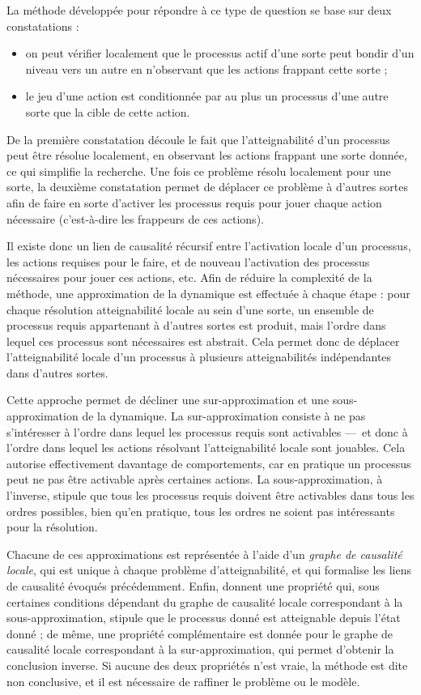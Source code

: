 La méthode développée pour répondre à ce type de question
se base sur deux constatations :
\begin{itemize}
  \item on peut vérifier localement que le processus actif d'une sorte peut
    bondir d'un niveau vers un autre en n'observant que les actions frappant cette sorte ;
  \item le jeu d'une action est conditionnée par au plus un processus d'une autre sorte
    que la cible de cette action.
\end{itemize}
De la première constatation découle le fait que l'atteignabilité d'un processus
peut être résolue localement, en observant les actions frappant une sorte donnée,
ce qui simplifie la recherche.
Une fois ce problème résolu localement pour une sorte, 
la deuxième constatation permet de déplacer ce problème
à d'autres sortes afin de faire en sorte d'activer les processus requis
pour jouer chaque action nécessaire (c'est-à-dire les frappeurs de ces actions).

Il existe donc un lien de causalité récursif entre l'activation locale d'un processus,
les actions requises pour le faire, et de nouveau l'activation des processus
nécessaires pour jouer ces actions, etc.
Afin de réduire la complexité de la méthode,
une approximation de la dynamique est effectuée à chaque étape :
pour chaque résolution atteignabilité locale au sein d'une sorte,
un ensemble de processus requis appartenant à d'autres sortes est produit,
mais l'ordre dans lequel ces processus sont nécessaires est abstrait.
Cela permet donc de déplacer l'atteignabilité locale d'un processus
à plusieurs atteignabilités indépendantes dans d'autres sortes.

Cette approche permet de décliner une sur-approximation et une sous-approximation de la dynamique.
La sur-approximation consiste à ne pas s'intéresser à l'ordre dans lequel les processus requis
sont activables ---~et donc à l'ordre dans lequel les actions résolvant l'atteignabilité
locale sont jouables.
Cela autorise effectivement davantage de comportements, car en pratique un processus
peut ne pas être activable après certaines actions.
La sous-approximation, à l'inverse, stipule que tous les processus requis doivent
être activables dans tous les ordres possibles,
bien qu'en pratique, tous les ordres ne soient pas intéressants pour la résolution.

Chacune de ces approximations est représentée à l'aide d'un \emph{graphe de causalité locale},
qui est unique à chaque problème d'atteignabilité,
et qui formalise les liens de causalité évoqués précédemment.
Enfin,  donnent une propriété qui, sous certaines conditions dépendant du
graphe de causalité locale correspondant à la sous-approximation,
stipule que le processus donné est atteignable depuis l'état donné ;
de même, une propriété complémentaire est donnée pour le graphe de causalité locale
correspondant à la sur-approximation, qui permet d'obtenir la conclusion inverse.
Si aucune des deux propriétés n'est vraie, la méthode est dite non conclusive,
et il est nécessaire de raffiner le problème ou le modèle.

